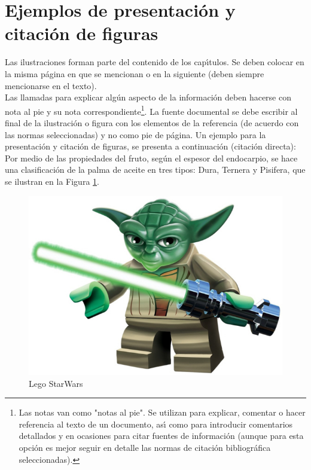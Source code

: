 \section{Ejemplos de presentaci\'{o}n y citaci\'{o}n de figuras}
Las ilustraciones forman parte del contenido de los cap\'{\i}tulos. Se deben colocar en la misma p\'{a}gina en que se mencionan o en la siguiente (deben siempre mencionarse en el texto).\\

Las llamadas para explicar alg\'{u}n aspecto de la informaci\'{o}n deben hacerse con nota al pie y su nota correspondiente\footnote{Las notas van como "notas al pie". Se utilizan para explicar, comentar o hacer referencia al texto de un documento, as\'{\i} como para introducir comentarios detallados y en ocasiones para citar fuentes de informaci\'{o}n (aunque para esta opci\'{o}n es mejor seguir en detalle las normas de citaci\'{o}n bibliogr\'{a}fica seleccionadas).}. La fuente documental se debe escribir al final de la ilustraci\'{o}n o figura con los elementos de la referencia (de acuerdo con las normas seleccionadas) y no como pie de p\'{a}gina. Un ejemplo para la presentaci\'{o}n y citaci\'{o}n de figuras, se presenta a continuaci\'{o}n (citaci\'{o}n directa):\\

Por medio de las propiedades del fruto, seg\'{u}n el espesor del endocarpio, se hace una clasificaci\'{o}n de la palma de aceite en tres tipos: Dura, Ternera y Pisifera, que se ilustran en la Figura
\ref{fig:yoda2}.\\
\begin{figure}
    \centering%
    \includegraphics{Images/ImagenYoda.jpg}%
    \caption{Lego StarWars~\cite{LucasArts2010Yoda} }
    \label{fig:yoda2}
\end{figure}

